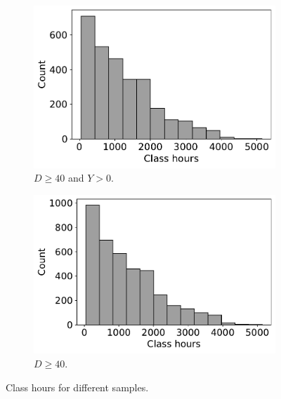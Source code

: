 \begin{figure}[H]
\begin{centering}
     \begin{subfigure}[b]{0.45\textwidth}
         \centering
         \includegraphics[width=\textwidth]{img/hist_dm_filter_bma.pdf}
         \vspace{-15pt}
         \caption{$D\geq 40$ and $Y>0$.}
     \end{subfigure}
     \hfill
     \begin{subfigure}[b]{0.45\textwidth}
         \centering
         \includegraphics[width=\textwidth]{img/hist_d_filter_bma.pdf}
         \vspace{-15pt}
         \caption{$D\geq 40$.}
     \end{subfigure}
\par
\caption{\label{fig:hist}
Class hours for different samples.}
\end{centering}
\end{figure}


